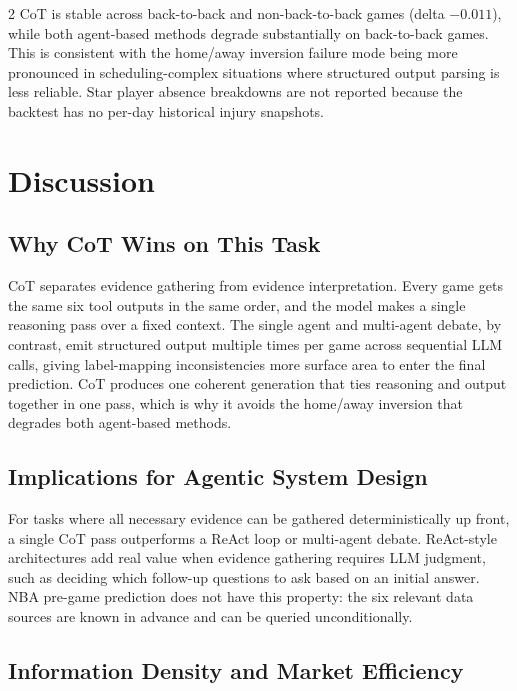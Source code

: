 \documentclass[11pt]{article}
\begin{document}
\begin{multicols}{2}
CoT is stable across back-to-back and non-back-to-back games (delta $-0.011$), while both agent-based methods degrade substantially on back-to-back games. This is consistent with the home/away inversion failure mode being more pronounced in scheduling-complex situations where structured output parsing is less reliable. Star player absence breakdowns are not reported because the backtest has no per-day historical injury snapshots.

\section{Discussion}

\subsection{Why CoT Wins on This Task}

CoT separates evidence gathering from evidence interpretation. Every game gets the same six tool outputs in the same order, and the model makes a single reasoning pass over a fixed context. The single agent and multi-agent debate, by contrast, emit structured output multiple times per game across sequential LLM calls, giving label-mapping inconsistencies more surface area to enter the final prediction. CoT produces one coherent generation that ties reasoning and output together in one pass, which is why it avoids the home/away inversion that degrades both agent-based methods.

\subsection{Implications for Agentic System Design}

For tasks where all necessary evidence can be gathered deterministically up front, a single CoT pass outperforms a ReAct loop or multi-agent debate. ReAct-style architectures add real value when evidence gathering requires LLM judgment, such as deciding which follow-up questions to ask based on an initial answer. NBA pre-game prediction does not have this property: the six relevant data sources are known in advance and can be queried unconditionally.

\subsection{Information Density and Market Efficiency}


\end{multicols}
\end{document}
